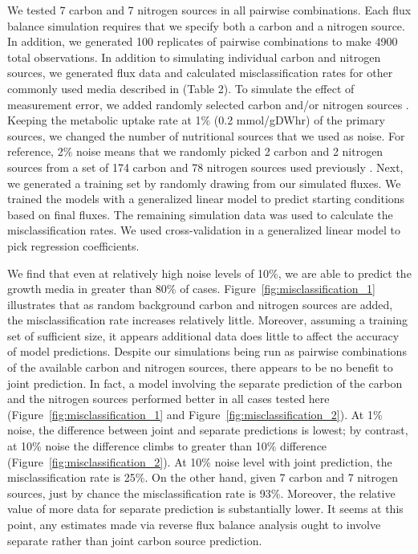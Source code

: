 \documentclass[12pt]{article}
\begin{document}
We tested 7 carbon and 7 nitrogen sources in all pairwise combinations. Each flux balance simulation requires that we specify both a carbon and a nitrogen source. In addition, we generated 100 replicates of pairwise combinations to make 4900 total observations. In addition to simulating individual carbon and nitrogen sources, we generated flux data and calculated misclassification rates for other commonly used media described in (Table 2). To simulate the effect of measurement error, we added randomly selected carbon and/or nitrogen sources \cite{Feistetal2007}. Keeping the metabolic uptake rate at 1\% (0.2 mmol/gDWhr) of the primary sources, we changed the number of nutritional sources that we used as noise. For reference, 2\% noise means that we randomly picked 2 carbon and 2 nitrogen sources from a set of 174 carbon and 78 nitrogen sources used previously \cite{Feistetal2007}. Next, we generated a training set by randomly drawing from our simulated fluxes. We trained the models with a generalized linear model to predict starting conditions based on final fluxes. The remaining simulation data was used to calculate the misclassification rates. We used cross-validation in a generalized linear model to pick regression coefficients. 

We find that even at relatively high noise levels of 10\%, we are able to predict the growth media in greater than 80\% of cases. Figure~\ref{fig:misclassification_1} illustrates that as random background carbon and nitrogen sources are added, the misclassification rate increases relatively little. Moreover, assuming a training set of sufficient size, it appears additional data does little to affect the accuracy of model predictions. Despite our simulations being run as pairwise combinations of the available carbon and nitrogen sources, there appears to be no benefit to joint prediction. In fact, a model involving the separate prediction of the carbon and the nitrogen sources performed better in all cases tested here (Figure~\ref{fig:misclassification_1} and Figure~\ref{fig:misclassification_2}). At 1\% noise, the difference between joint and separate predictions is lowest; by contrast, at 10\% noise the difference climbs to greater than 10\% difference (Figure~\ref{fig:misclassification_2}). At 10\% noise level with joint prediction, the misclassification rate is 25\%. On the other hand, given 7 carbon and 7 nitrogen sources, just by chance the misclassification rate is 93\%. Moreover, the relative value of more data for separate prediction is substantially lower. It seems at this point, any estimates made via reverse flux balance analysis ought to involve separate rather than joint carbon source prediction.
\end{document}
